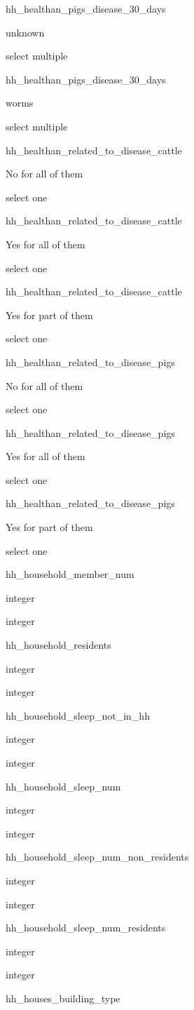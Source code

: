 \documentclass[]{article}
\begin{document}
hh\_healthan\_pigs\_disease\_30\_days

unknown

select multiple

hh\_healthan\_pigs\_disease\_30\_days

worms

select multiple

hh\_healthan\_related\_to\_disease\_cattle

No for all of them

select one

hh\_healthan\_related\_to\_disease\_cattle

Yes for all of them

select one

hh\_healthan\_related\_to\_disease\_cattle

Yes for part of them

select one

hh\_healthan\_related\_to\_disease\_pigs

No for all of them

select one

hh\_healthan\_related\_to\_disease\_pigs

Yes for all of them

select one

hh\_healthan\_related\_to\_disease\_pigs

Yes for part of them

select one

hh\_household\_member\_num

integer

integer

hh\_household\_residents

integer

integer

hh\_household\_sleep\_not\_in\_hh

integer

integer

hh\_household\_sleep\_num

integer

integer

hh\_household\_sleep\_num\_non\_residents

integer

integer

hh\_household\_sleep\_num\_residents

integer

integer

hh\_houses\_building\_type
\end{document}
